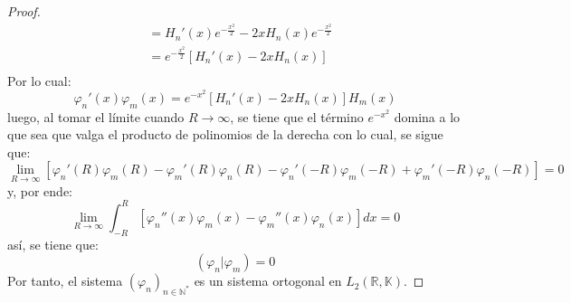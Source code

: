 \documentclass[12pt]{report}
\theoremstyle{largebreak}
\newcommand\pint[2]{\ensuremath{\left(#1\big|#2\right)}}
\begin{document}
\begin{proof}
\begin{equation*}
\begin{split}
                &=H_n'(x)e^{-\frac{x^2}{2}}-2xH_n(x)e^{-\frac{x^2}{2}}\\
                &=e^{-\frac{x^2}{2}}\left[H_n'(x)-2xH_n(x)\right] \\
            \end{split}
        \end{equation*}
        Por lo cual:
        \begin{equation*}
            \varphi_n'(x)\varphi_m(x)=e^{-x^2}\left[H_n'(x)-2xH_n(x)\right]H_m(x)
        \end{equation*}
        luego, al tomar el límite cuando $R\rightarrow\infty$, se tiene que el término $e^{-x^2}$ domina a lo que sea que valga el producto de polinomios de la derecha con lo cual, se sigue que:
        \begin{equation*}
            \lim_{R\rightarrow\infty}\left[\varphi_n'(R)\varphi_m(R)-\varphi_m'(R)\varphi_n(R)-\varphi_n'(-R)\varphi_m(-R)+\varphi_m'(-R)\varphi_n(-R)\right]=0
        \end{equation*}
        y, por ende:
        \begin{equation*}
            \lim_{R\rightarrow\infty} \int_{-R}^R\left[\varphi_n''(x)\varphi_m(x)-\varphi_m''(x) \varphi_n(x)\right]dx=0
        \end{equation*}
        así, se tiene que:
        \begin{equation*}
            \pint{\varphi_n}{\varphi_m}=0
        \end{equation*}
        Por tanto, el sistema $\left(\varphi_n \right)_{ n\in\mathbb{N}^*}$ es un sistema ortogonal en $L_2(\mathbb{R},\mathbb{K})$.


\end{proof}
\end{document}
